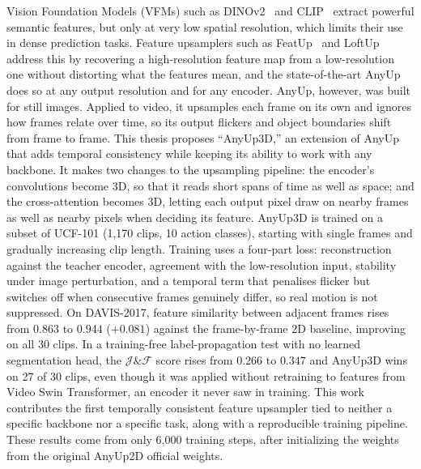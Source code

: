 Vision Foundation Models (VFMs) such as DINOv2~\cite{dinov2} and CLIP~\cite{radford2021clip} extract powerful semantic features, but only at very low spatial resolution, which limits their use in dense prediction tasks. Feature upsamplers such as FeatUp~\cite{featup} and LoftUp~\cite{loftup} address this by recovering a high-resolution feature map from a low-resolution one without distorting what the features mean, and the state-of-the-art AnyUp~\cite{anyup} does so at any output resolution and for any encoder. AnyUp, however, was built for still images. Applied to video, it upsamples each frame on its own and ignores how frames relate over time, so its output flickers and object boundaries shift from frame to frame. This thesis proposes ``AnyUp3D,'' an extension of AnyUp that adds temporal consistency while keeping its ability to work with any backbone. It makes two changes to the upsampling pipeline: the encoder's convolutions become 3D, so that it reads short spans of time as well as space; and the cross-attention becomes 3D, letting each output pixel draw on nearby frames as well as nearby pixels when deciding its feature. AnyUp3D is trained on a subset of UCF-101 (1{,}170 clips, 10 action classes), starting with single frames and gradually increasing clip length. Training uses a four-part loss: reconstruction against the teacher encoder, agreement with the low-resolution input, stability under image perturbation, and a temporal term that penalises flicker but switches off when consecutive frames genuinely differ, so real motion is not suppressed. On DAVIS-2017, feature similarity between adjacent frames rises from $0.863$ to $0.944$ ($+0.081$) against the frame-by-frame 2D baseline, improving on all 30 clips. In a training-free label-propagation test with no learned segmentation head, the $\mathcal{J}\&\mathcal{F}$ score rises from $0.266$ to $0.347$ and AnyUp3D wins on 27 of 30 clips, even though it was applied without retraining to features from Video Swin Transformer, an encoder it never saw in training. This work contributes the first temporally consistent feature upsampler tied to neither a specific backbone nor a specific task, along with a reproducible training pipeline. These results come from only 6{,}000 training steps, after initializing the weights from the original AnyUp2D official weights.